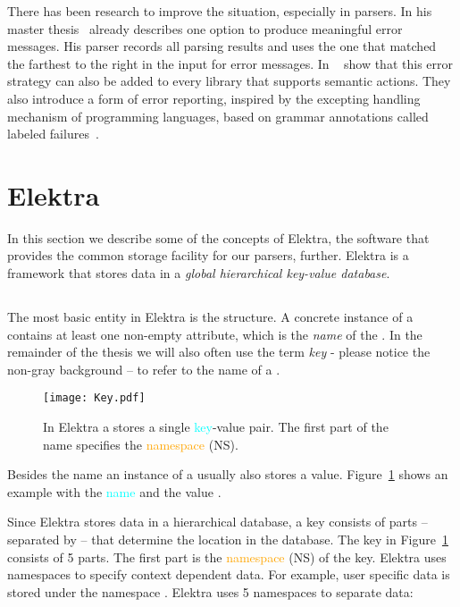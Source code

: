 There has been research to improve the situation, especially in  parsers. In his master thesis~\cite{ford2002packrat} \citeauthor{ford2002packrat} already describes one option to produce meaningful error messages. His parser records all parsing results and uses the one that matched the farthest to the right in the input for error messages. In ~\cite{maidl2016labeled} \citeauthor{maidl2016labeled} show that this error strategy can also be added to every  library that supports semantic actions. They also introduce a form of error reporting, inspired by the excepting handling mechanism of programming languages, based on grammar annotations called labeled failures~\cite{maidl2016labeled}.

\section{Elektra}

In this section we describe some of the concepts of Elektra, the software that provides the common storage facility for our  parsers, further. Elektra is a framework that stores data in a \emph{global hierarchical key-value database}.

\subsection{}

The most basic entity in Elektra is the  structure. A concrete instance of a  contains at least one non-empty attribute, which is the \emph{name} of the . In the remainder of the thesis we will also often use the term \emph{key} - please notice the non-gray background – to refer to the name of a .

\begin{figure}
  \centering
    \texttt{[image: Key.pdf]}
  \caption{In Elektra a  stores a single \textcolor{Aqua}{key}-\textcolor{Purple3}{value} pair. The first part of the name specifies the \textcolor{orange}{namespace} (NS).}
  \label{fig:key}
\end{figure}

Besides the name an instance of a  usually also stores a value. Figure~\ref{fig:key} shows an example  with the \textcolor{Aqua}{name}  and the \textcolor{Purple3}{value} .

Since Elektra stores data in a hierarchical database, a key consists of parts – separated by \code{/} – that determine the location in the database. The key in Figure~\ref{fig:key} consists of 5 parts. The first part  is the \textcolor{orange}{namespace} (NS) of the key. Elektra uses namespaces to specify context dependent data. For example, user specific data is stored under the namespace . Elektra uses 5 namespaces to separate data:

